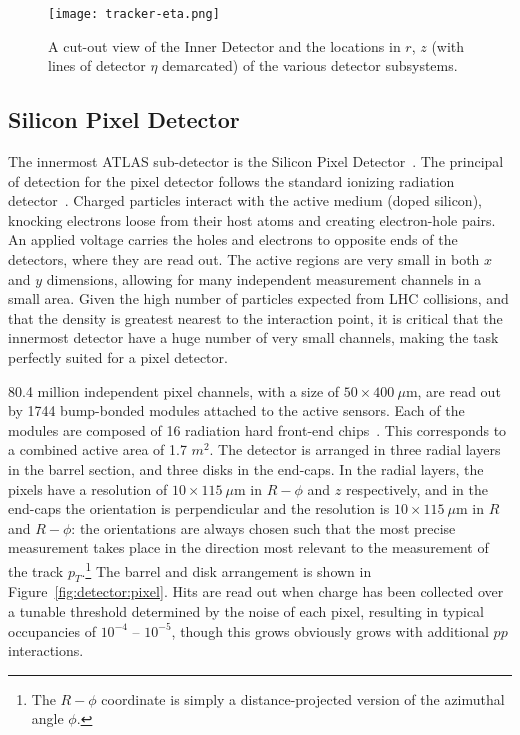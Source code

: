 

\begin{figure}
\centering
\texttt{[image: tracker-eta.png]}
\caption{A cut-out view of the Inner Detector and the locations in $r$, $z$ (with lines of detector $\eta$ demarcated) of the various detector subsystems.}
\label{fig:detector:inner-detector-3}
\end{figure}



\subsection{Silicon Pixel Detector}

The innermost ATLAS sub-detector is the Silicon Pixel Detector~\cite{Pixel,ATLASPaper}. The principal of detection for the pixel detector follows the standard ionizing radiation detector~\cite{Detectors}. Charged particles interact with the active medium (doped silicon), knocking electrons loose from their host atoms and creating electron-hole pairs. An applied voltage carries the holes and electrons to opposite ends of the detectors, where they are read out. The active regions are very small in both $x$ and $y$ dimensions, allowing for many independent measurement channels in a small area. Given the high number of particles expected from LHC collisions, and that the density is greatest nearest to the interaction point, it is critical that the innermost detector have a huge number of very small channels, making the task perfectly suited for a pixel detector.

80.4 million independent pixel channels, with a size of $50 \times 400~\mu$m, are read out by 1744 bump-bonded modules attached to the active sensors. Each of the modules are composed of 16 radiation hard front-end chips~\cite{ATLASPaper}. This corresponds to a combined active area of 1.7 $m^2$. The detector is arranged in three radial layers in the barrel section, and three disks in the end-caps. In the radial layers, the pixels have a resolution of $10 \times 115~\mu$m in $R-\phi$ and $z$ respectively, and in the end-caps the orientation is perpendicular and the resolution is $10 \times 115~\mu$m in $R$ and $R-\phi$: the orientations are always chosen such that the most precise measurement takes place in the direction most relevant to the measurement of the track $p_T$.\footnote{The $R-\phi$ coordinate is simply a distance-projected version of the azimuthal angle $\phi$.} The barrel and disk arrangement is shown in Figure~\ref{fig:detector:pixel}. Hits are read out when charge has been collected over a tunable threshold determined by the noise of each pixel, resulting in typical occupancies of $10^{-4}$ -- $10^{-5}$, though this grows obviously grows with additional $pp$ interactions.

